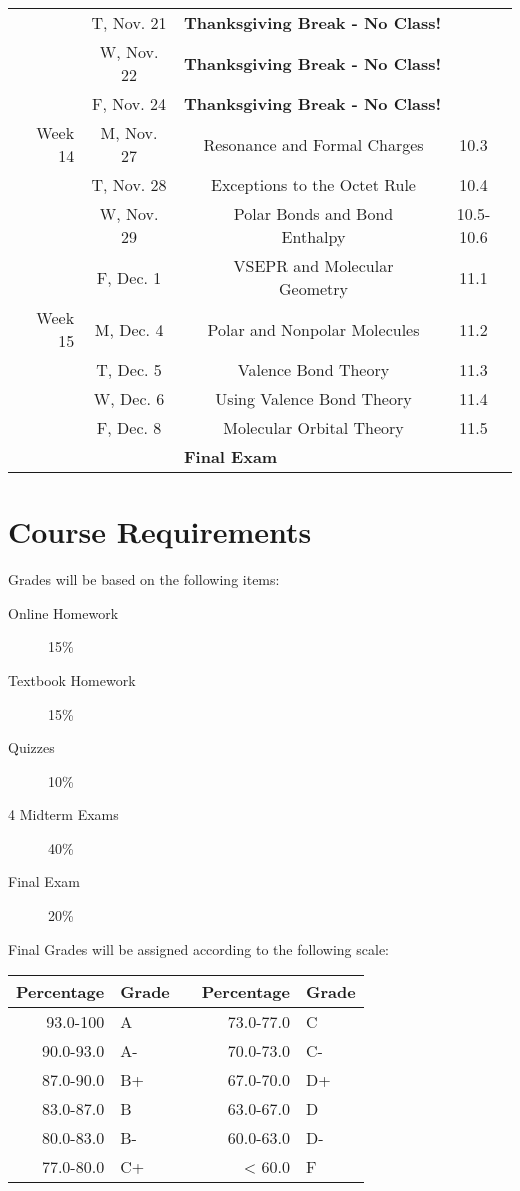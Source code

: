 \documentclass[12pt, letterpaper]{article}
\begin{document}
\begin{tabular}{rcccc}
	& T, Nov. 21& \multicolumn{3}{l}{\textbf{Thanksgiving Break - No Class!}}\\
	& W, Nov. 22& \multicolumn{3}{l}{\textbf{Thanksgiving Break - No Class!}}\\
	& F, Nov. 24& \multicolumn{3}{l}{\textbf{Thanksgiving Break - No Class!}}\\
	\midrule
	Week 14 & M, Nov. 27&& Resonance and Formal Charges & 10.3\\
	& T, Nov. 28&& Exceptions to the Octet Rule & 10.4\\
	& W, Nov. 29&& Polar Bonds and Bond Enthalpy & 10.5-10.6\\
	& F, Dec. 1&& VSEPR and Molecular Geometry & 11.1\\
	\midrule
	Week 15 & M, Dec. 4&& Polar and Nonpolar Molecules & 11.2\\
	& T, Dec. 5&& Valence Bond Theory & 11.3\\
	& W, Dec. 6&& Using Valence Bond Theory & 11.4\\
	& F, Dec. 8&& Molecular Orbital Theory & 11.5\\
	\midrule
	\midrule
	& & \multicolumn{3}{l}{\textbf{Final Exam}}\\
\end{tabular}

\section*{Course Requirements}
Grades will be based on the following items:
\begin{description}
  \item[Online Homework] 15\%
  \item[Textbook Homework] 15\%
  \item[Quizzes] 10\%
  \item[4 Midterm Exams] 40\%
  \item[Final Exam] 20\%  
\end{description}
Final Grades will be assigned according to the following scale:

\begin{tabular}{rl|c|rl}
	Percentage & Grade &  & Percentage & Grade \\ \midrule
	  93.0-100 & A     &  &  73.0-77.0 & C     \\
	 90.0-93.0 & A-    &  &  70.0-73.0 & C-    \\
	 87.0-90.0 & B+    &  &  67.0-70.0 & D+    \\
	 83.0-87.0 & B     &  &  63.0-67.0 & D     \\
	 80.0-83.0 & B-    &  &  60.0-63.0 & D-    \\
	 77.0-80.0 & C+    &  &     < 60.0 & F
\end{tabular}
\end{document}
